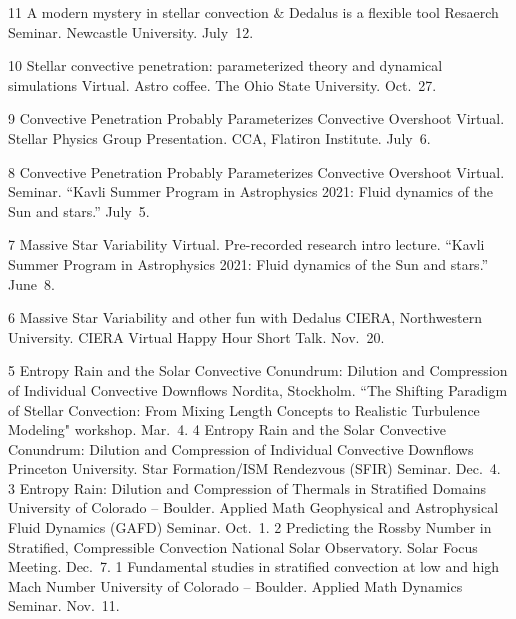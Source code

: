 
      {11}
      { A modern mystery in stellar convection \& Dedalus is a flexible tool }
      {
        Resaerch Seminar. Newcastle University. July~12.
      }

	  {10}
	  {Stellar convective penetration: parameterized theory and dynamical simulations}
	  {
	  	Virtual. Astro coffee. The Ohio State University. Oct.~27.
	  }

\cvpub{}
	  {9}
	  {Convective Penetration Probably Parameterizes Convective Overshoot}
	  {
	  	Virtual. Stellar Physics Group Presentation. CCA, Flatiron Institute. July~6.
	  }

\cvpub{}
	  {8}
	  {Convective Penetration Probably Parameterizes Convective Overshoot}
	  {
	  	Virtual. Seminar. ``Kavli Summer Program in Astrophysics 2021: Fluid dynamics of the Sun and stars.'' July~5.
	  }


\cvpub{}
	  {7}
	  {Massive Star Variability}
	  {
	  	Virtual. Pre-recorded research intro lecture. ``Kavli Summer Program in Astrophysics 2021: Fluid dynamics of the Sun and stars.'' June~8.
	  }

	  {6}
	  {Massive Star Variability and other fun with Dedalus}
	  {
	  	CIERA, Northwestern University. CIERA Virtual Happy Hour Short Talk. Nov.~20.
	  }

\cvpub{}
	  {5}
	  {Entropy Rain and the Solar Convective Conundrum: Dilution and Compression of Individual Convective Downflows}
	  {
	  	Nordita, Stockholm. ``The Shifting Paradigm of Stellar Convection: From Mixing Length Concepts to Realistic Turbulence Modeling" workshop. Mar.~4.
	  }
	  {4}
	  {Entropy Rain and the Solar Convective Conundrum: Dilution and Compression of Individual Convective Downflows}
	  {
	  	Princeton University. Star Formation/ISM Rendezvous (SFIR) Seminar. Dec.~4.
	  }
\cvpub{}
	  {3}
	  {Entropy Rain: Dilution and Compression of Thermals in Stratified Domains}
	  {
	  	University of Colorado -- Boulder. Applied Math Geophysical and Astrophysical Fluid Dynamics (GAFD) Seminar. Oct.~1.
	  }
	  {2}
	  {Predicting the Rossby Number in Stratified, Compressible Convection}
	  {
	  	National Solar Observatory. Solar Focus Meeting. Dec.~7.
	  }
      {1}
      {Fundamental studies in stratified convection at low and high Mach Number}
      {
        University of Colorado -- Boulder. Applied Math Dynamics Seminar. Nov.~11.
      }
